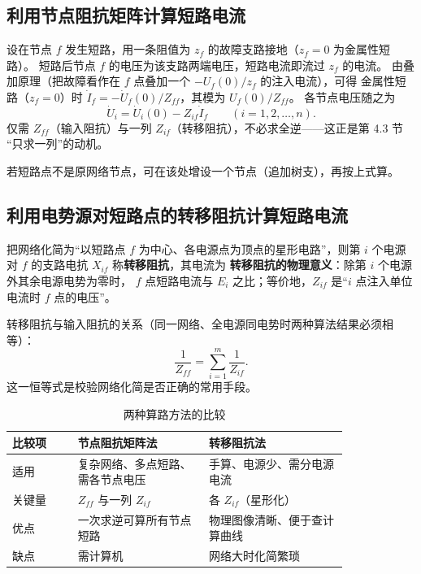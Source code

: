 \subsection{利用节点阻抗矩阵计算短路电流}

设在节点 $f$ 发生短路，用一条阻值为 $z_f$ 的故障支路接地（$z_f=0$ 为金属性短路）。
短路后节点 $f$ 的电压为该支路两端电压，短路电流即流过 $z_f$ 的电流。
由叠加原理（把故障看作在 $f$ 点叠加一个 $-U_f(0)/z_f$ 的注入电流），可得
金属性短路（$z_f=0$）时 $\dot I_f=-\dot U_f(0)/Z_{ff}$，其模为 $U_f(0)/Z_{ff}$。
各节点电压随之为
\begin{equation}
  \dot U_i=\dot U_i(0)-Z_{if}\dot I_f
  \qquad(i=1,2,\dots,n).
\end{equation}
仅需 $Z_{ff}$（输入阻抗）与一列 $Z_{if}$（转移阻抗），不必求全逆——这正是第 4.3 节
“只求一列”的动机。

若短路点不是原网络节点，可在该处增设一个节点（追加树支），再按上式算。

\subsection{利用电势源对短路点的转移阻抗计算短路电流}

把网络化简为“以短路点 $f$ 为中心、各电源点为顶点的星形电路”，则第 $i$ 个电源
对 $f$ 的支路电抗 $X_{if}$ 称\textbf{转移阻抗}，其电流为
\textbf{转移阻抗的物理意义}：除第 $i$ 个电源外其余电源电势为零时，
$f$ 点短路电流与 $E_i$ 之比；等价地，$Z_{if}$ 是“$i$ 点注入单位电流时 $f$ 点的电压”。

转移阻抗与输入阻抗的关系（同一网络、全电源同电势时两种算法结果必须相等）：
\begin{equation}
  \frac{1}{Z_{ff}}=\sum_{i=1}^{m}\frac{1}{Z_{if}} .
\end{equation}
这一恒等式是校验网络化简是否正确的常用手段。

\begin{table}[htbp]
  \centering
  \caption{两种算路方法的比较}
  \small
  \begin{tabular}{@{}p{0.16\linewidth}p{0.32\linewidth}p{0.34\linewidth}@{}}
    \toprule
    比较项 & 节点阻抗矩阵法 & 转移阻抗法 \\
    \midrule
    适用 & 复杂网络、多点短路、需各节点电压 & 手算、电源少、需分电源电流 \\
    关键量 & $Z_{ff}$ 与一列 $Z_{if}$ & 各 $Z_{if}$（星形化） \\
    优点 & 一次求逆可算所有节点短路 & 物理图像清晰、便于查计算曲线 \\
    缺点 & 需计算机 & 网络大时化简繁琐 \\
    \bottomrule
  \end{tabular}
\end{table}

